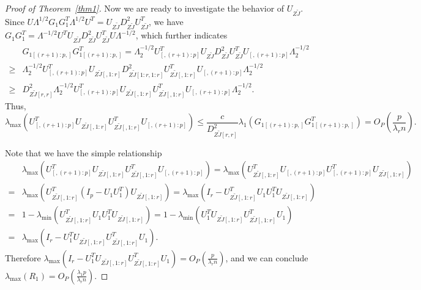 \documentclass[review]{elsarticle}
\theoremstyle{plain}
\theoremstyle{definition}
\theoremstyle{remark}
\begin{document}
\begin{proof}[\textrm{Proof of Theorem~\ref{thm1}}]
Now we are ready to investigate the behavior of $U_{Z\tilde{J}}$.
Since
$
U\Lambda^{1/2} G_1 G_1^T \Lambda^{1/2} U^T 
=U_{Z\tilde{J}}D_{Z\tilde{J}}^2 U_{Z\tilde{J}}^T
$,
we have
$
G_1 G_1^T  
=\Lambda^{-1/2} U^T U_{Z\tilde{J}}D_{Z\tilde{J}}^2 U_{Z\tilde{J}}^TU\Lambda^{-1/2}
$, which further indicates
$$
\begin{aligned}
&G_{1[(r+1):p,]} G_{1[(r+1):p,]}^T  
=\Lambda_{2}^{-1/2} U_{[,(r+1):p]}^T U_{Z\tilde{J}}D_{Z\tilde{J}}^2 U_{Z\tilde{J}}^T U_{[,(r+1):p]}\Lambda_{2}^{-1/2}\\
\geq&
\Lambda_{2}^{-1/2} U_{[,(r+1):p]}^T U_{Z\tilde{J}[,1:r]}D_{Z\tilde{J}[1:r,1:r]}^2 U_{Z\tilde{J}[,1:r]}^T U_{[,(r+1):p]}\Lambda_{2}^{-1/2}\\
\geq&
D_{Z\tilde{J}[r,r]}^2
\Lambda_{2}^{-1/2} U_{[,(r+1):p]}^T U_{Z\tilde{J}[,1:r]} U_{Z\tilde{J}[,1:r]}^T U_{[,(r+1):p]}\Lambda_{2}^{-1/2}.
\end{aligned}
$$
Thus,
$$
\lambda_{\max}(U_{[,(r+1):p]}^T U_{Z\tilde{J}[,1:r]} U_{Z\tilde{J}[,1:r]}^T U_{[,(r+1):p]})\leq
\frac{c}{D^2_{Z\tilde{J}[r,r]}} \lambda_{1}
(G_{1[(r+1):p,]} G_{1[(r+1):p,]}^T)
=O_P(\frac{p}{\lambda_r n}).
$$

Note that we have the simple relationship
$$
\begin{aligned}
&\lambda_{\max}(U_{[,(r+1):p]}^T U_{Z\tilde{J}[,1:r]} U_{Z\tilde{J}[,1:r]}^T U_{[,(r+1):p]})
=
\lambda_{\max}( U_{Z\tilde{J}[,1:r]}^T U_{[,(r+1):p]}U_{[,(r+1):p]}^T U_{Z\tilde{J}[,1:r]})\\
=&
\lambda_{\max}( U_{Z\tilde{J}[,1:r]}^T (I_p- U_1 U_1^T) U_{Z\tilde{J}[,1:r]})=
\lambda_{\max}(I_r- U_{Z\tilde{J}[,1:r]}^T  U_1 U_1^T U_{Z\tilde{J}[,1:r]})\\
=&
1-\lambda_{\min}( U_{Z\tilde{J}[,1:r]}^T  U_1 U_1^T U_{Z\tilde{J}[,1:r]})
=
1-\lambda_{\min}(U_1^T U_{Z\tilde{J}[,1:r]}U_{Z\tilde{J}[,1:r]}^T U_1)\\
=&
\lambda_{\max}(I_r-U_1^T U_{Z\tilde{J}[,1:r]}U_{Z\tilde{J}[,1:r]}^T U_1).
\end{aligned}
$$
Therefore 
$
\lambda_{\max}(I_r-U_1^T U_{Z\tilde{J}[,1:r]}U_{Z\tilde{J}[,1:r]}^T U_1)
=O_P(\frac{ p}{\lambda_r n})
$, and we can conclude
$\lambda_{\max}(R_1)=O_P(\frac{\lambda_1 p}{\lambda_r n})$.


\end{proof}
\end{document}
